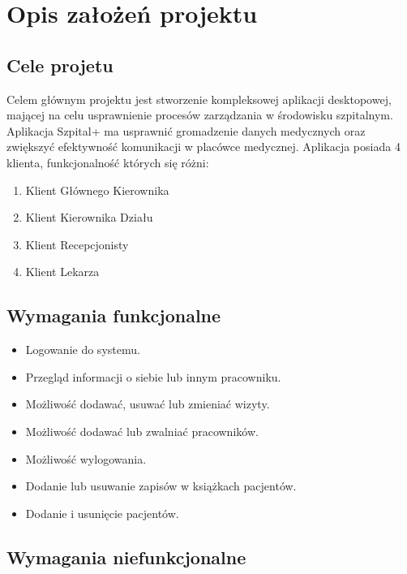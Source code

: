 \chapter{Opis założeń projektu}
\section{Cele projetu}

Celem głównym projektu jest stworzenie kompleksowej aplikacji desktopowej, mającej na celu usprawnienie procesów zarządzania w środowisku szpitalnym. Aplikacja \textquotedbl Szpital+\textquotedbl{} ma usprawnić gromadzenie danych medycznych oraz zwiększyć efektywność komunikacji w placówce medycznej. Aplikacja posiada 4 klienta, funkcjonalność których się różni:
\renewcommand{\labelenumi}{\alph{enumi})}
\begin{enumerate}
    \item{Klient Głównego Kierownika}
    \item{Klient Kierownika Działu} 
    \item{Klient Recepcjonisty}
    \item{Klient Lekarza}
\end{enumerate}

\section{Wymagania funkcjonalne}

\begin{itemize}
    \item Logowanie do systemu.
    \item Przegląd informacji o siebie lub innym pracowniku.
    \item Możliwość dodawać, usuwać lub zmieniać wizyty.
    \item Możliwość dodawać lub zwalniać pracowników.
    \item Możliwość wylogowania.
    \item Dodanie lub usuwanie zapisów w książkach pacjentów.
    \item Dodanie i usunięcie pacjentów.
\end{itemize}

\section{Wymagania niefunkcjonalne}

